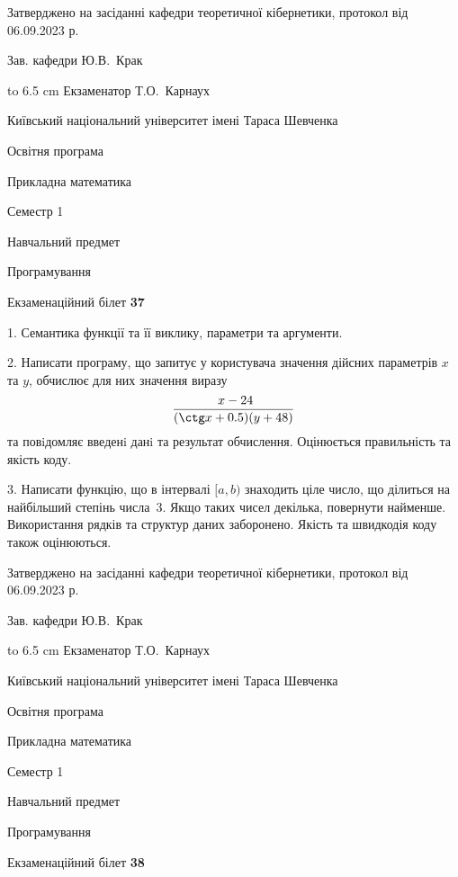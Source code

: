 \documentclass[12pt, ukrainian]{article}
\begin{document}
{\smallskip\smallskip \begin {scriptsize} Затверджено на засіданні кафедри теоретичної кібернетики, протокол   від   06.09.2023 р.\par\smallskip\smallskip\smallskip\smallskip
{\parbox {6.5 cm} {Зав. кафедри \dotfill Ю.В.~Крак}}\hspace {0.7cm} {\hbox to 6.5 cm { Екзаменатор \dotfill Т.О.~Карнаух}} \end{scriptsize}}
\newpage
{{\begin {scriptsize}\par
{ \center  Київський національний університет імені Тараса Шевченка \par}
{\parbox {5 cm}{Освітня програма \hfill}{\parbox {7 cm}{Прикладна математика\hfill}}\parbox {6 cm}{\hfill Семестр 1}}\par
{\parbox {5 cm} {Навчальний предмет \hfill}\parbox {7 cm}{Програмування \hfill}\parbox {6cm}{\hfill}\par}\vspace{-15pt} \end{scriptsize}}{\center Екзаменаційний білет \No \textbf { 37 }\par}}
{%
1. Семантика функції та її виклику, параметри та аргументи.%
\par
2. Написати програму, що запитує у користувача значення дійсних параметрів $x$ та $y$, обчислює для них значення виразу 
$$\frac{\ x - 24}{(\ctg x + 0.5) (y + 48)}$$ 
та повiдомляє введенi данi та результат обчислення.
 Оцінюється правильність та якість коду.

\par
3. Написати функцію, що в інтервалі $[a, b)$ знаходить ціле число, що ділиться на найбільший степінь числа 3. Якщо таких чисел декілька, повернути найменше.  Використання рядків та структур даних заборонено. Якість та швидкодія коду також оцінюються. 

}
{\smallskip\smallskip \begin {scriptsize} Затверджено на засіданні кафедри теоретичної кібернетики, протокол   від   06.09.2023 р.\par\smallskip\smallskip\smallskip\smallskip
{\parbox {6.5 cm} {Зав. кафедри \dotfill Ю.В.~Крак}}\hspace {0.7cm} {\hbox to 6.5 cm { Екзаменатор \dotfill Т.О.~Карнаух}} \end{scriptsize}}
\vspace{0.9cm}
{{\begin {scriptsize}\par
{ \center  Київський національний університет імені Тараса Шевченка \par}
{\parbox {5 cm}{Освітня програма \hfill}{\parbox {7 cm}{Прикладна математика\hfill}}\parbox {6 cm}{\hfill Семестр 1}}\par
{\parbox {5 cm} {Навчальний предмет \hfill}\parbox {7 cm}{Програмування \hfill}\parbox {6cm}{\hfill}\par}\vspace{-15pt} \end{scriptsize}}{\center Екзаменаційний білет \No \textbf { 38 }\par}}
\end{document}
